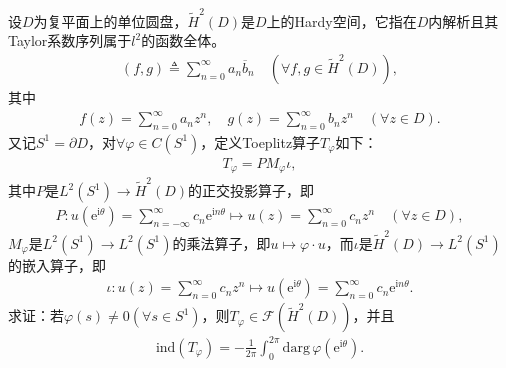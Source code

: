 \documentclass[../../main.tex]{subfiles}%
\begin{document}
\begin{example}
设$D$为复平面上的单位圆盘，$\widetilde{H}^{2}(D)$是$D$上的Hardy空间，它指在$D$内解析且其Taylor系数序列属于$l^{2}$的函数全体。
\begin{align*}
(f,g)\triangleq\sum\limits_{n=0}^{\infty}a_{n}\overline{b}_{n}\quad(\forall f,g\in\widetilde{H}^{2}(D)),
\end{align*}
其中
\begin{align*}
f(z)=\sum\limits_{n=0}^{\infty}a_{n}z^{n},\quad g(z)=\sum\limits_{n=0}^{\infty}b_{n}z^{n}\quad(\forall z\in D).
\end{align*}
又记$S^{1}=\partial D$，对$\forall\varphi\in C(S^{1})$，定义Toeplitz算子$T_{\varphi}$如下：
\begin{align*}
T_{\varphi}=PM_{\varphi}\iota,
\end{align*}
其中$P$是$L^{2}(S^{1})\to\widetilde{H}^{2}(D)$的正交投影算子，即
\begin{align*}
P:u(\mathrm{e}^{\mathrm{i}\theta})=\sum\limits_{n=-\infty}^{\infty}c_{n}\mathrm{e}^{\mathrm{i}n\theta}\mapsto u(z)=\sum\limits_{n=0}^{\infty}c_{n}z^{n}\quad(\forall z\in D),
\end{align*}
$M_{\varphi}$是$L^{2}(S^{1})\to L^{2}(S^{1})$的乘法算子，即$u\mapsto\varphi\cdot u$，而$\iota$是$\widetilde{H}^{2}(D)\to L^{2}(S^{1})$的嵌入算子，即
\begin{align*}
\iota:u(z)=\sum\limits_{n=0}^{\infty}c_{n}z^{n}\mapsto u(\mathrm{e}^{\mathrm{i}\theta})=\sum\limits_{n=0}^{\infty}c_{n}\mathrm{e}^{\mathrm{i}n\theta}.
\end{align*}
求证：若$\varphi(s)\neq0(\forall s\in S^{1})$，则$T_{\varphi}\in\mathscr{F}(\widetilde{H}^{2}(D))$，并且
\begin{align*}
\mathrm{ind}(T_{\varphi})=-\frac{1}{2\pi}\int_{0}^{2\pi}\mathrm{darg}\,\varphi(\mathrm{e}^{\mathrm{i}\theta}).
\end{align*}
\end{example}
\end{document}
